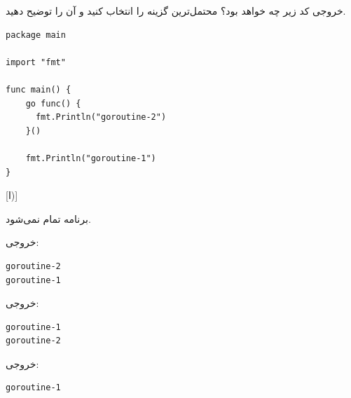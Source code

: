 
خروجی کد زیر چه خواهد بود؟ محتمل‌ترین گزینه را انتخاب کنید و آن را توضیح دهید.

\begin{latin}
\begin{verbatim}
package main

import "fmt"

func main() {
    go func() {
      fmt.Println("goroutine-2")
    }()

    fmt.Println("goroutine-1")
}
\end{verbatim}
\end{latin}

[ا)]

 برنامه تمام نمی‌شود.

 خروجی:

\begin{latin}
\begin{verbatim}
goroutine-2
goroutine-1
\end{verbatim}
\end{latin}

 خروجی:

\begin{latin}
\begin{verbatim}
goroutine-1
goroutine-2
\end{verbatim}
\end{latin}

 خروجی:

\begin{latin}
\begin{verbatim}
goroutine-1
\end{verbatim}
\end{latin}


